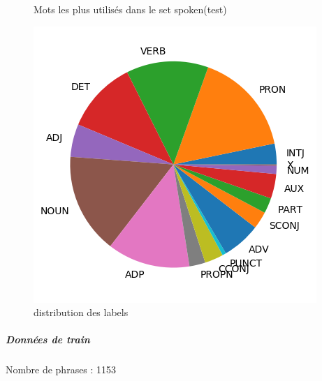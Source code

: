 \begin{figure}[H]
\begin{minipage}{0.48\textwidth}
\begin{tabular}{|l || *{11 }{|c} |}
\end{tabular}
\caption{ Mots les plus utilisés dans le set spoken(test) } \label{Fig:muw}\end{minipage} 
\begin{minipage}{0.48\textwidth} \centering
\includegraphics[width=.7\linewidth]{spokentest_img.png}
\caption{distribution des labels}
\end{minipage}
\end{figure} \subparagraph{Données de train \\ }  
 Nombre de phrases : 1153\\ 
